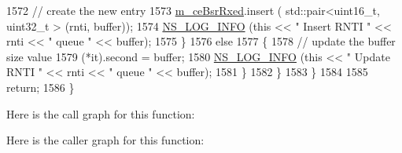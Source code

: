 \begin{DoxyCode}
1572                                 \textcolor{comment}{// create the new entry}
1573                                 \hyperlink{classns3_1_1MmWaveFlexTtiMacScheduler_a3f24f21e6b97c5f90be970f6f8b3bffa}{m\_ceBsrRxed}.insert ( std::pair<uint16\_t, uint32\_t > (rnti, 
      buffer));
1574                                 \hyperlink{group__logging_gafbd73ee2cf9f26b319f49086d8e860fb}{NS\_LOG\_INFO} (\textcolor{keyword}{this} << \textcolor{stringliteral}{" Insert RNTI "} << rnti << \textcolor{stringliteral}{" queue "} << 
      buffer);
1575                         \}
1576                         \textcolor{keywordflow}{else}
1577                         \{
1578                                 \textcolor{comment}{// update the buffer size value}
1579                                 (*it).second = buffer;
1580                                 \hyperlink{group__logging_gafbd73ee2cf9f26b319f49086d8e860fb}{NS\_LOG\_INFO} (\textcolor{keyword}{this} << \textcolor{stringliteral}{" Update RNTI "} << rnti << \textcolor{stringliteral}{" queue "} << 
      buffer);
1581                         \}
1582                 \}
1583         \}
1584 
1585         \textcolor{keywordflow}{return};
1586 \}
\end{DoxyCode}


Here is the call graph for this function\+:




Here is the caller graph for this function\+:


